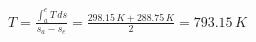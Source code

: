 \( T = \frac{\int_{a}^{e} T \, ds}{s_a - s_e} = \frac{298.15 \, K + 288.75 \, K}{2} = 793.15 \, K \)